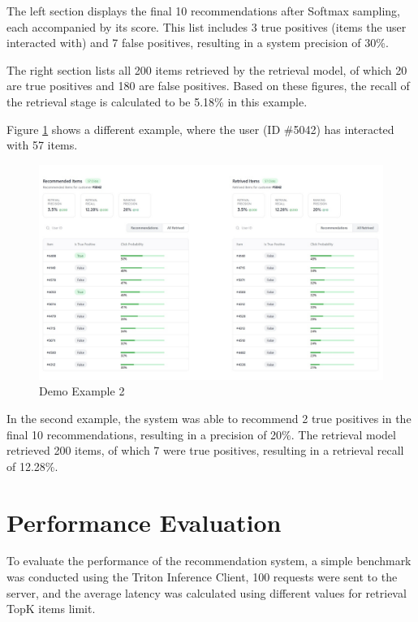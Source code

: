 The left section displays the final 10 recommendations after Softmax sampling, each accompanied by its score. This list includes 3 true positives (items the user interacted with) and 7 false positives, resulting in a system precision of 30\%.

The right section lists all 200 items retrieved by the retrieval model, of which 20 are true positives and 180 are false positives. Based on these figures, the recall of the retrieval stage is calculated to be 5.18\% in this example.

Figure \ref{fig: Demo2} shows a different example, where the user (ID \#5042) has interacted with 57 items.

\begin{figure}[H]
    \centering
    \includegraphics[width=\textwidth]{assets/demo_2.jpeg}
    \caption{Demo Example 2}
    \label{fig: Demo2}
\end{figure}

In the second example, the system was able to recommend 2 true positives in the final 10 recommendations, resulting in a precision of 20\%. 
The retrieval model retrieved 200 items, of which 7 were true positives, resulting in a retrieval recall of 12.28\%.


\section{Performance Evaluation}

To evaluate the performance of the recommendation system, a simple benchmark was conducted using the Triton Inference Client,
 100 requests were sent to the server, and the average latency was calculated using different values for retrieval TopK items limit.

